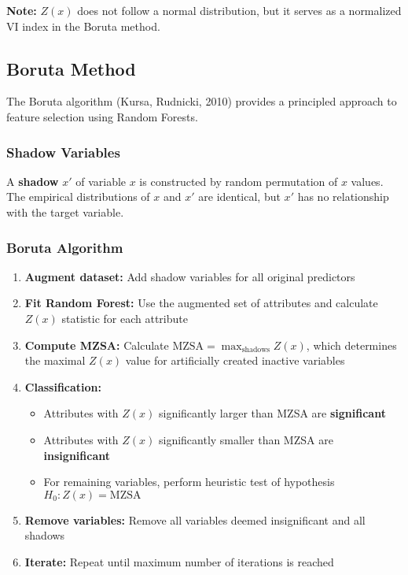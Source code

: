 \documentclass[12pt,a4paper]{article}
\begin{document}
\textbf{Note:} $Z(x)$ does not follow a normal distribution, but it serves as a normalized VI index in the Boruta method.

\subsection{Boruta Method}

The Boruta algorithm (Kursa, Rudnicki, 2010) provides a principled approach to feature selection using Random Forests.

\subsubsection{Shadow Variables}
A \textbf{shadow} $x'$ of variable $x$ is constructed by random permutation of $x$ values. The empirical distributions of $x$ and $x'$ are identical, but $x'$ has no relationship with the target variable.

\subsubsection{Boruta Algorithm}
\begin{enumerate}
    \item \textbf{Augment dataset:} Add shadow variables for all original predictors
    \item \textbf{Fit Random Forest:} Use the augmented set of attributes and calculate $Z(x)$ statistic for each attribute
    \item \textbf{Compute MZSA:} Calculate $\text{MZSA} = \max_{\text{shadows}} Z(x)$, which determines the maximal $Z(x)$ value for artificially created inactive variables
    \item \textbf{Classification:} 
    \begin{itemize}
        \item Attributes with $Z(x)$ significantly larger than MZSA are \textbf{significant}
        \item Attributes with $Z(x)$ significantly smaller than MZSA are \textbf{insignificant}
        \item For remaining variables, perform heuristic test of hypothesis $H_0: Z(x) = \text{MZSA}$
    \end{itemize}
    \item \textbf{Remove variables:} Remove all variables deemed insignificant and all shadows
    \item \textbf{Iterate:} Repeat until maximum number of iterations is reached
\end{enumerate}
\end{document}
